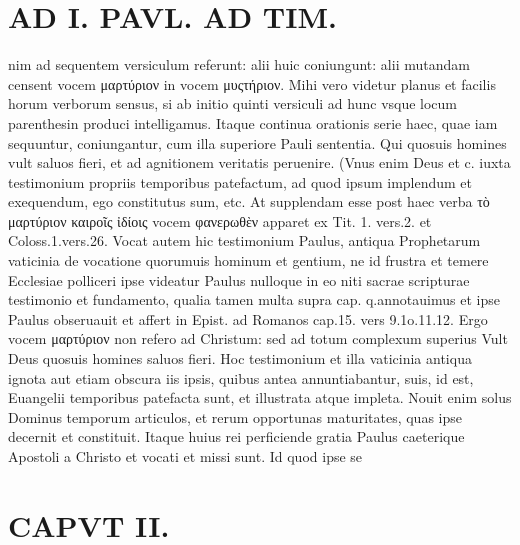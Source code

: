 \documentclass{article}
\begin{document}
\begin{pages}
\section*{AD I. PAVL. AD TIM. }
\marginpar{[ p.62 ]}\pstart nim ad sequentem versiculum referunt: alii huic coniungunt: alii mutandam censent vocem μαρτύριον in vocem μυςτήριον. Mihi vero videtur planus et facilis horum verborum sensus, si ab initio quinti versiculi ad hunc vsque locum parenthesin produci intelligamus. Itaque continua orationis serie haec, quae iam sequuntur, coniungantur, cum illa superiore Pauli sententia. Qui quosuis homines vult saluos fieri, et ad agnitionem veritatis peruenire. (Vnus enim Deus et c. iuxta testimonium propriis temporibus patefactum, ad quod ipsum implendum et exequendum, ego constitutus sum, etc. At supplendam esse post haec verba τὸ μαρτύριον καιροῖς ἰδίοις vocem φανερωθὲν apparet ex Tit. 1. vers.2. et Coloss.1.vers.26. Vocat autem hic testimonium Paulus, antiqua Prophetarum vaticinia de vocatione quorumuis hominum et gentium, ne id frustra et temere Ecclesiae polliceri ipse videatur Paulus nulloque in eo niti sacrae scripturae testimonio et fundamento, qualia tamen multa supra cap. q.annotauimus et ipse Paulus obseruauit et affert in Epist. ad Romanos cap.15. vers 9.1o.11.12. Ergo vocem μαρτύριον non refero ad Christum: sed ad totum complexum superius Vult Deus quosuis homines saluos fieri. Hoc testimonium et illa vaticinia antiqua ignota aut etiam obscura iis ipsis, quibus antea annuntiabantur, suis, id est, Euangelii temporibus patefacta sunt, et illustrata atque impleta. Nouit enim solus Dominus temporum articulos, et rerum opportunas maturitates, quas ipse decernit et constituit. Itaque huius rei perficiende gratia Paulus caeterique Apostoli a Christo et vocati et missi sunt. Id quod ipse se\pend
\section*{CAPVT  II. }\pstart {}
{}

\end{pages}
\end{document}
